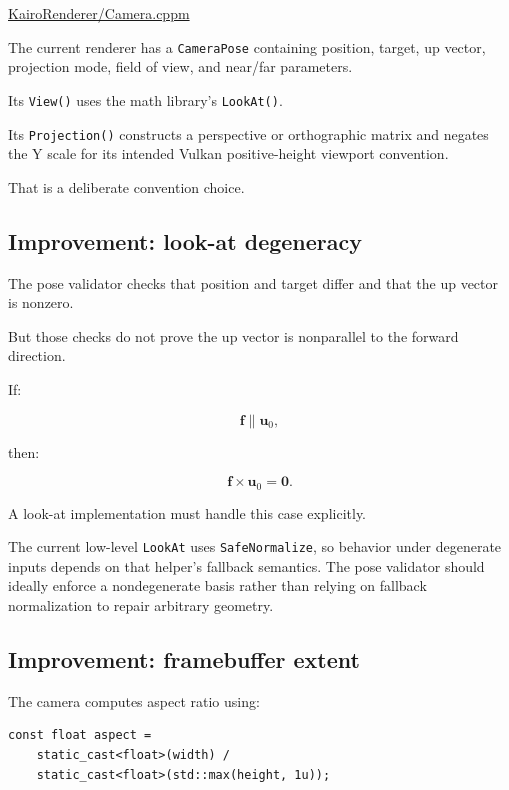 \href{https://github.com/swayam8624/KairoRenderer/blob/main/Camera.cppm?utm_source=chatgpt.com}{KairoRenderer/Camera.cppm}

The current renderer has a \texttt{CameraPose} containing position, target, up vector, projection mode, field of view, and near/far parameters.

Its \texttt{View()} uses the math library's \texttt{LookAt()}.

Its \texttt{Projection()} constructs a perspective or orthographic matrix and negates the Y scale for its intended Vulkan positive-height viewport convention.

That is a deliberate convention choice.

\subsection{Improvement: look-at degeneracy}\label{02-foundations-ii-ch037-improvement-look-at-degeneracy}

The pose validator checks that position and target differ and that the up vector is nonzero.

But those checks do not prove the up vector is nonparallel to the forward direction.

If:

\[
 \mathbf f\parallel\mathbf u_0,
\]

then:

\[
 \mathbf f\times\mathbf u_0=\mathbf0.
\]

A look-at implementation must handle this case explicitly.

The current low-level \texttt{LookAt} uses \texttt{SafeNormalize}, so behavior under degenerate inputs depends on that helper's fallback semantics. The pose validator should ideally enforce a nondegenerate basis rather than relying on fallback normalization to repair arbitrary geometry.

\subsection{Improvement: framebuffer extent}\label{02-foundations-ii-ch037-improvement-framebuffer-extent}

The camera computes aspect ratio using:

\begin{verbatim}
const float aspect =
    static_cast<float>(width) /
    static_cast<float>(std::max(height, 1u));
\end{verbatim}

